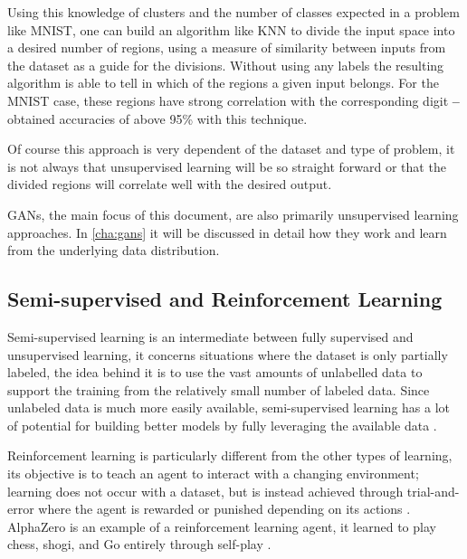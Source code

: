 Using this knowledge of clusters and the number of classes expected in a problem like \gls{MNIST}, one can build an algorithm like \gls{KNN} to divide the input space into a desired number of regions, using a measure of similarity between inputs from the dataset as a guide for the divisions. Without using any labels the resulting algorithm is able to tell in which of the regions a given input belongs. For the \gls{MNIST} case, these regions have strong correlation with the corresponding digit \textbf{--} \cite{fashionMNIST2017} obtained accuracies of above 95\% with this technique.

Of course this approach is very dependent of the dataset and type of problem, it is not always that unsupervised learning will be so straight forward or that the divided regions will correlate well with the desired output.

\acp{GAN}, the main focus of this document, are also primarily unsupervised learning approaches. In \autoref{cha:gans} it will be discussed in detail how they work and learn from the underlying data distribution.

\subsection{Semi-supervised and Reinforcement Learning} \label{sub:semi-supervised_and_RL}
Semi-supervised learning is an intermediate between fully supervised and unsupervised learning, it concerns situations where the dataset is only partially labeled, the idea behind it is to use the vast amounts of unlabelled data to support the training from the relatively small number of labeled data. Since unlabeled data is much more easily available, semi-supervised learning has a lot of potential for building better models by fully leveraging the available data \cite{semi_supervised2005}.

Reinforcement learning is particularly different from the other types of learning, its objective is to teach an agent to interact with a changing environment; learning does not occur with a dataset, but is instead achieved through trial-and-error where the agent is rewarded or punished depending on its actions \cite{reinforcement_learning1996}. AlphaZero is an example of a reinforcement learning agent, it learned to play chess, shogi, and Go entirely through self-play \cite{alphaZero2017}.
